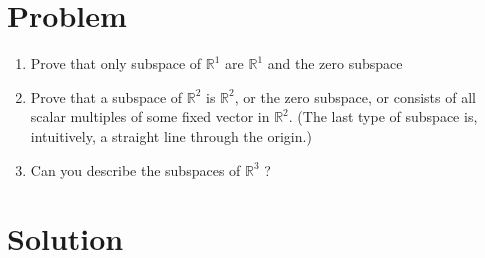 \documentclass[journal,12pt,twocolumn]{IEEEtran}
\begin{document}
\section{Problem}
\begin{enumerate}[label=\alph*.]
    \item Prove that only subspace of $\mathbb{R}^1$ are $\mathbb{R}^1$ and the zero subspace 
    \item Prove that a subspace of $\mathbb{R}^2$ is $\mathbb{R}^2$, or the zero subspace, or consists of all scalar multiples of some fixed vector in $\mathbb{R}^2$. (The last type of subspace is, intuitively,
a straight line through the origin.)
	\item Can you describe the subspaces of $\mathbb{R}^3$ ?
\end{enumerate}
\section{Solution}
\end{document}

